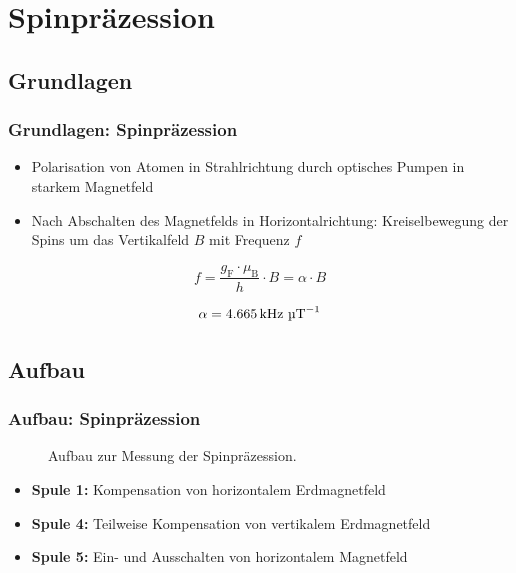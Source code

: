 
\section{Spinpräzession}
\subsection{Grundlagen}
\begin{frame}
\frametitle{Grundlagen: Spinpräzession}

\begin{itemize}
  \item Polarisation von Atomen in Strahlrichtung durch optisches Pumpen in starkem Magnetfeld
  \item Nach Abschalten des Magnetfelds in Horizontalrichtung: Kreiselbewegung der Spins um das Vertikalfeld $B$ mit Frequenz $f$
\end{itemize}


\begin{equation*}
    f=\frac{g_\text{F} \cdot \mu_\text{B}}{h} \cdot B = \alpha \cdot B
\end{equation*}
  
  
\begin{equation*}
    \alpha = 4.665\,\text{kHz } \text{\textmu T}^{-1}
\end{equation*}

\end{frame}

\subsection{Aufbau}
\begin{frame}
\frametitle{Aufbau: Spinpräzession}


\begin{figure}
    \centering
    \def\svgwidth{\textwidth}
    
    \caption{Aufbau zur Messung der Spinpräzession.}
\end{figure}

\begin{itemize}
  \item \textbf{Spule 1:} Kompensation von horizontalem Erdmagnetfeld
  \item \textbf{Spule 4:} Teilweise Kompensation von vertikalem Erdmagnetfeld
  \item \textbf{Spule 5:} Ein- und Ausschalten von horizontalem Magnetfeld
\end{itemize}

\end{frame}

